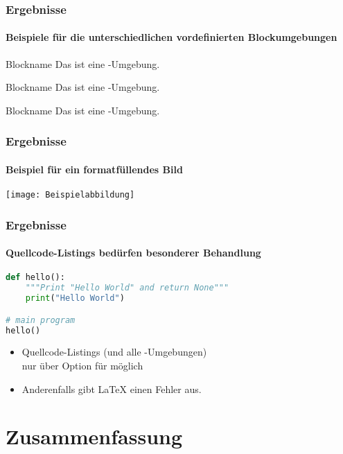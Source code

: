 \documentclass[utf8]{beamer}
\begin{document}
\begin{frame}
\frametitle{Ergebnisse}
\framesubtitle{Beispiele für die unterschiedlichen vordefinierten Blockumgebungen}

\begin{block}{Blockname}
Das ist eine -Umgebung.
\end{block}

\begin{alertblock}{Blockname}
Das ist eine -Umgebung.
\end{alertblock}

\begin{exampleblock}{Blockname}
Das ist eine -Umgebung.
\end{exampleblock}

\end{frame}


\begin{frame}
\frametitle{Ergebnisse}
\framesubtitle{Beispiel für ein formatfüllendes Bild}

\texttt{[image: Beispielabbildung]}

\end{frame}


\begin{frame}[fragile]
\frametitle{Ergebnisse}
\framesubtitle{Quellcode-Listings bedürfen besonderer Behandlung}

\begin{lstlisting}[language=Python]
def hello():
    """Print "Hello World" and return None"""
    print("Hello World")

# main program
hello()
\end{lstlisting}

\begin{itemize}
\item Quellcode-Listings (und alle -Umgebungen)\\ nur über Option  für  möglich
\item Anderenfalls gibt \LaTeX{} einen Fehler aus.
\end{itemize}

\end{frame}


\section{Zusammenfassung}
\end{document}
